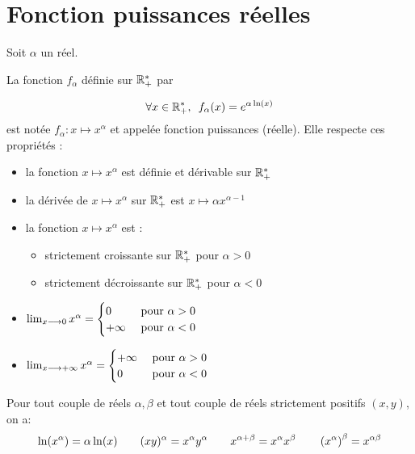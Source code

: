 \section{Fonction puissances réelles}
\begin{defi}
    Soit \(\alpha\) un réel.

    La fonction \(f_{\alpha}\) définie sur \(\mathbb{R}_+^*\) par 

    \[\quantifs{\forall x \in \Rps} f_{\alpha}(x) = e^{\alpha \ln(x)} \]
    est notée \(f_{\alpha}: x \mapsto x^{\alpha}\) et appelée fonction puissances (réelle). Elle respecte ces propriétés : 
    \begin{itemize}
        \item la fonction \(x\mapsto x^{\alpha}\) est définie et dérivable sur \(\mathbb{R}_+^*\)
        \item la dérivée de \(x\mapsto x^{\alpha}\) sur \(\mathbb{R}_+^*\) est \(x\mapsto \alpha x^{\alpha-1}\)
        \item la fonction \(x\mapsto x^{\alpha}\) est : 
        \begin{itemize}
            \item strictement croissante sur \(\mathbb{R}_+^*\) pour \(\alpha > 0 \) 
            \item strictement décroissante  sur \(\mathbb{R}_+^*\) pour \(\alpha < 0 \) 
        \end{itemize}
        \item  \(\lim_{x\longrightarrow 0} x^{\alpha} = \begin{cases}
            0 &\text{ pour } \alpha >0 \\
            +\infty &\text{ pour } \alpha <0
        \end{cases}\)
        \item  
        \(\lim_{x\longrightarrow +\infty} x^{\alpha} = 
        \begin{cases}
            +\infty &\text{ pour } \alpha >0 \\
             0 &\text{ pour } \alpha <0
        \end{cases}
        \)
    \end{itemize}
\end{defi}

\begin{prop}
    Pour tout couple de réels \(\alpha,\beta\) et tout couple de réels strictement positifs \((x,y)\), on a:
    \[\ln(x^{\alpha}) = \alpha \ln(x) \qquad (xy)^{\alpha} = x^{\alpha}y^{\alpha} \qquad x^{\alpha+\beta} = x^{\alpha}x^{\beta} \qquad \left(x^{\alpha}\right)^{\beta} = x^{\alpha \beta}\]
\end{prop}

